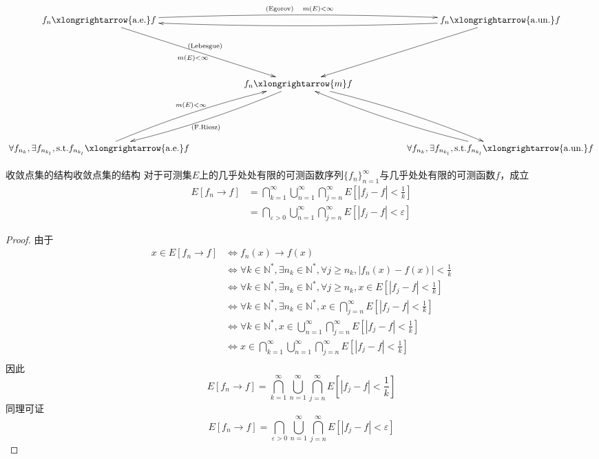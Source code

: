 \documentclass[lang = cn, scheme = chinese, thmcnt = section]{elegantbook}
\newcommand{\N}{\mathbb{N}}            %
\newcommand{\toae}{\xlongrightarrow{\mathrm{a.e.}}}
\newcommand{\toaun}{\xlongrightarrow{\mathrm{a.un.}}}
\newcommand{\tom}{\xlongrightarrow{m}}
\begin{document}
$$
\xymatrix{
	f_n\toae f  \ar@/^/[rrrr]^{(\text{Egorov})\quad m(E)<\infty} \ar[ddrr]_{m(E)<\infty}^{(\text{Lebesgue})} & & & & f_n\toaun f \ar@/^/[llll] \ar[ddll] \\
	& & & & \\
	& & f_n\tom f \ar@/^/[ddll]^{(\text{F.Riesz})} \ar@/^/[ddrr] & & \\
	& & & & \\
	\forall f_{n_k},\exists f_{n_{k_l}},\text{s.t.}f_{n_{k_l}}\toae f \ar@/^/[uurr]^{m(E)<\infty} & & & & \forall f_{n_k},\exists f_{n_{k_l}},\text{s.t.}f_{n_{k_l}}\toaun f \ar@/^/[uull]
}
$$

\begin{theorem}{收敛点集的结构}{收敛点集的结构}
	对于可测集$E$上的几乎处处有限的可测函数序列$\{f_n\}_{n=1}^{\infty}$与几乎处处有限的可测函数$f$，成立
	\begin{align*}
		E[f_n\to f]
		& = \bigcap_{k=1}^{\infty}\bigcup_{n=1}^{\infty}\bigcap_{j=n}^{\infty}E\left[ |f_j-f|<\frac{1}{k} \right] \\
		& = \bigcap_{\varepsilon>0}\bigcup_{n=1}^{\infty}\bigcap_{j=n}^{\infty}E[ |f_j-f|<\varepsilon ]
	\end{align*}
\end{theorem}

\begin{proof}
	由于
	\begin{align*}
		x\in E[f_n\to f]
		& \iff f_n(x)\to f(x) \\
		& \iff \forall k\in\N^*,\exists n_k\in\N^*,\forall j\ge n_k,|f_n(x)-f(x)|<\frac{1}{k} \\
		& \iff \forall k\in\N^*,\exists n_k\in\N^*,\forall j\ge n_k,x\in E\left[ |f_j-f|<\frac{1}{k} \right] \\
		& \iff \forall k\in\N^*,\exists n_k\in\N^*,x\in \bigcap_{j=n}^{\infty}E\left[ |f_j-f|<\frac{1}{k} \right] \\
		& \iff \forall k\in\N^*,x\in \bigcup_{n=1}^{\infty}\bigcap_{j=n}^{\infty}E\left[ |f_j-f|<\frac{1}{k} \right] \\
		& \iff x\in \bigcap_{k=1}^{\infty}\bigcup_{n=1}^{\infty}\bigcap_{j=n}^{\infty}E\left[ |f_j-f|<\frac{1}{k} \right] \\
	\end{align*}
	因此
	$$
	E[f_n\to f]
	=\bigcap_{k=1}^{\infty}\bigcup_{n=1}^{\infty}\bigcap_{j=n}^{\infty}E\left[ |f_j-f|<\frac{1}{k} \right]
	$$
	同理可证
	$$
	E[f_n\to f]
	=\bigcap_{\varepsilon>0}\bigcup_{n=1}^{\infty}\bigcap_{j=n}^{\infty}E[ |f_j-f|<\varepsilon ]
	$$
\end{proof}
\end{document}
